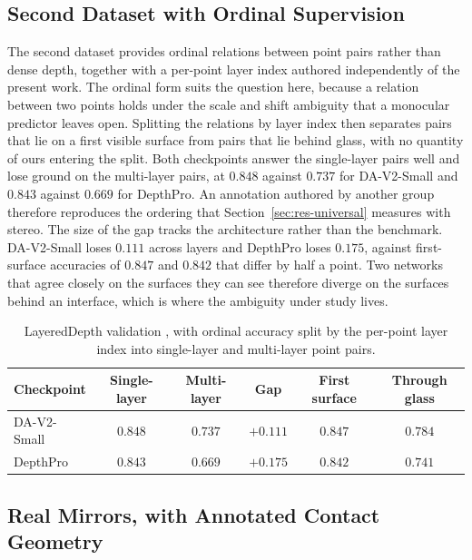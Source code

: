 \documentclass{article} %
\theoremstyle{defstyle}
\theoremstyle{plain}
\begin{document}
\subsection{Second Dataset with Ordinal Supervision}
\label{sec:supp-layered}

The second dataset provides ordinal relations between point pairs rather than dense depth,
together with a per-point layer index authored independently of the present work. The ordinal
form suits the question here, because a relation between two points holds under the scale and
shift ambiguity that a monocular predictor leaves open. Splitting the relations by layer index
then separates pairs that lie on a first visible surface from pairs that lie behind glass, with
no quantity of ours entering the split. Both checkpoints answer the single-layer pairs well
and lose ground on the multi-layer pairs, at $0.848$ against $0.737$ for DA-V2-Small and
$0.843$ against $0.669$ for DepthPro. An annotation authored by another group therefore
reproduces the ordering that Section~\ref{sec:res-universal} measures with stereo. The size of
the gap tracks the architecture rather than the benchmark. DA-V2-Small loses $0.111$ across
layers and DepthPro loses $0.175$, against first-surface accuracies of $0.847$ and $0.842$ that
differ by half a point. Two networks that agree closely on the surfaces they can see therefore
diverge on the surfaces behind an interface, which is where the ambiguity under study lives.

\begin{table}[htb]
\caption{LayeredDepth validation \citep{layereddepth2025}, with ordinal accuracy split by the per-point layer index into single-layer and multi-layer point pairs.}
\label{tab:supp-layered}
\begin{center}
\footnotesize
\begin{tabular}{lccccc}
\toprule
\textbf{Checkpoint} & \textbf{Single-layer} & \textbf{Multi-layer} &
\textbf{Gap} & \textbf{First surface} & \textbf{Through glass} \\
\midrule
DA-V2-Small & $0.848$ & $0.737$ & $\mathbf{+0.111}$ & $0.847$ & $0.784$ \\
DepthPro    & $0.843$ & $0.669$ & $\mathbf{+0.175}$ & $0.842$ & $0.741$ \\
\bottomrule
\end{tabular}
\end{center}
\end{table}

\subsection{Real Mirrors, with Annotated Contact Geometry}
\label{sec:supp-mirrors}
\end{document}
